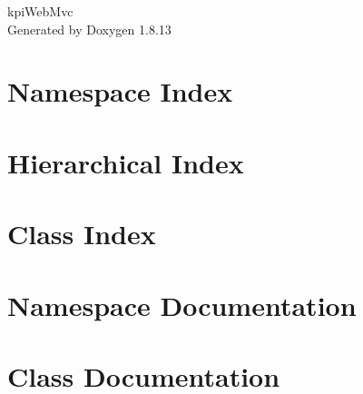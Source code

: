 \documentclass[twoside]{book}
\newcommand{\+}{\discretionary{\mbox{\scriptsize$\hookleftarrow$}}{}{}}
\newcommand{\clearemptydoublepage}{%
  \newpage{\pagestyle{empty}\cleardoublepage}%
}
\begin{document}
\hypersetup{pageanchor=false,
             bookmarksnumbered=true,
             pdfencoding=unicode
            }
\begin{titlepage}
\vspace*{7cm}
\begin{center}%
{\Large kpi\+Web\+Mvc }\\
\vspace*{1cm}
{\large Generated by Doxygen 1.8.13}\\
\end{center}
\end{titlepage}
\clearemptydoublepage
{}
\tableofcontents
\clearemptydoublepage
{}
\hypersetup{pageanchor=true}

\chapter{Namespace Index}

\chapter{Hierarchical Index}

\chapter{Class Index}

\chapter{Namespace Documentation}




\chapter{Class Documentation}























\backmatter
\newpage
{}
\clearemptydoublepage
{}
\printindex
\end{document}
